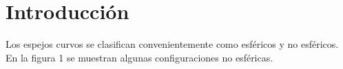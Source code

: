 \documentclass[13,twocolumn,letterpaper]{article}
\begin{document}
\section*{Introducción }
{ 
Los espejos curvos se clasifican convenientemente como esféricos y no esféricos. En la figura 1 se muestran algunas configuraciones no esféricas.

\begin{figure}[h!]
	\centering
	\hspace{1 cm}
	\hspace{1 cm}
	\\

\end{figure}}
\end{document}
